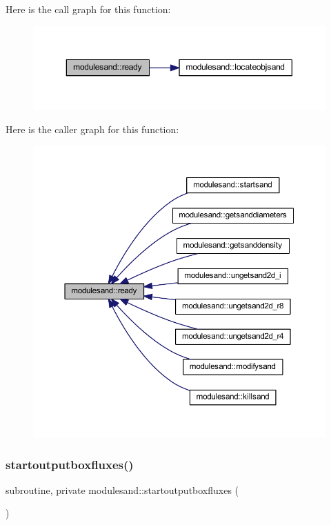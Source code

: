 Here is the call graph for this function\+:\nopagebreak
\begin{figure}[H]
\begin{center}
\leavevmode
\includegraphics[width=350pt]{namespacemodulesand_a663024ee5ee19e5c00cce90c271934ea_cgraph}
\end{center}
\end{figure}
Here is the caller graph for this function\+:\nopagebreak
\begin{figure}[H]
\begin{center}
\leavevmode
\includegraphics[width=350pt]{namespacemodulesand_a663024ee5ee19e5c00cce90c271934ea_icgraph}
\end{center}
\end{figure}
\mbox{\label{namespacemodulesand_a26a45201fee3769e27ba13227a832a22}} 
\subsubsection{\texorpdfstring{startoutputboxfluxes()}{startoutputboxfluxes()}}
{\footnotesize\ttfamily subroutine, private modulesand\+::startoutputboxfluxes (\begin{DoxyParamCaption}{ }\end{DoxyParamCaption})\hspace{0.3cm}{\ttfamily [private]}}

